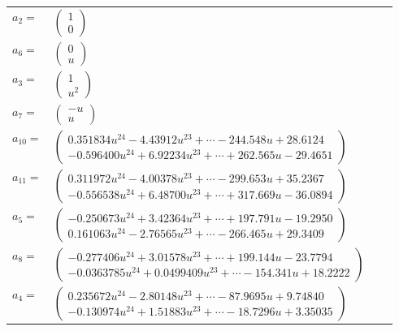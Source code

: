 \documentclass[1p]{elsarticle_modified}
\theoremstyle{definition}
\begin{document}
\begin{tabular}{m{7pt} m{180pt} m{7pt} m{180pt} }
\flushright $a_{2}=$&$\begin{pmatrix}1\\0\end{pmatrix}$ \\
\flushright $a_{6}=$&$\begin{pmatrix}0\\u\end{pmatrix}$ \\
\flushright $a_{3}=$&$\begin{pmatrix}1\\u^2\end{pmatrix}$ \\
\flushright $a_{7}=$&$\begin{pmatrix}- u\\u\end{pmatrix}$ \\
\flushright $a_{10}=$&$\begin{pmatrix}0.351834 u^{24}-4.43912 u^{23}+\cdots-244.548 u+28.6124\\-0.596400 u^{24}+6.92234 u^{23}+\cdots+262.565 u-29.4651\end{pmatrix}$ \\
\flushright $a_{11}=$&$\begin{pmatrix}0.311972 u^{24}-4.00378 u^{23}+\cdots-299.653 u+35.2367\\-0.556538 u^{24}+6.48700 u^{23}+\cdots+317.669 u-36.0894\end{pmatrix}$ \\
\flushright $a_{5}=$&$\begin{pmatrix}-0.250673 u^{24}+3.42364 u^{23}+\cdots+197.791 u-19.2950\\0.161063 u^{24}-2.76565 u^{23}+\cdots-266.465 u+29.3409\end{pmatrix}$ \\
\flushright $a_{8}=$&$\begin{pmatrix}-0.277406 u^{24}+3.01578 u^{23}+\cdots+199.144 u-23.7794\\-0.0363785 u^{24}+0.0499409 u^{23}+\cdots-154.341 u+18.2222\end{pmatrix}$ \\
\flushright $a_{4}=$&$\begin{pmatrix}0.235672 u^{24}-2.80148 u^{23}+\cdots-87.9695 u+9.74840\\-0.130974 u^{24}+1.51883 u^{23}+\cdots-18.7296 u+3.35035\end{pmatrix}$ \\

\end{tabular}
\end{document}
